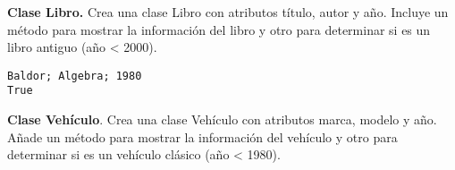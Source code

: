 \begin{exercise}{\rm 

\textbf{Clase Libro.} Crea una clase Libro con atributos título, autor y año. Incluye un
método para mostrar la información del libro y otro para determinar si
es un libro antiguo (año \textless{} 2000).

\begin{Shaded}
\begin{Highlighting}[]
     \NormalTok{(}
        \OperatorTok{=}
        \OperatorTok{=}
        \OperatorTok{=}

    \NormalTok{):}
         \SpecialCharTok{\{}\SpecialCharTok{\}}\SpecialStringTok{; }\SpecialCharTok{\{}\SpecialCharTok{\}}\SpecialStringTok{; }\SpecialCharTok{\{}\SpecialCharTok{\}}\SpecialStringTok{\textquotesingle{}}

    \NormalTok{):}
           \OperatorTok{\textless{}}   

\OperatorTok{=}\NormalTok{, }\NormalTok{, }\NormalTok{)}
\end{Highlighting}
\end{Shaded}

\begin{verbatim}
Baldor; Algebra; 1980
True

\end{verbatim}
}\end{exercise}

\begin{exercise}{\rm \textbf{Clase Vehículo}. 
Crea una clase Vehículo con atributos marca, modelo y año. Añade un
método para mostrar la información del vehículo y otro para determinar
si es un vehículo clásico (año \textless{} 1980).

\begin{Shaded}
\begin{Highlighting}[]

\end{Highlighting}
\end{Shaded}
}\end{exercise}

